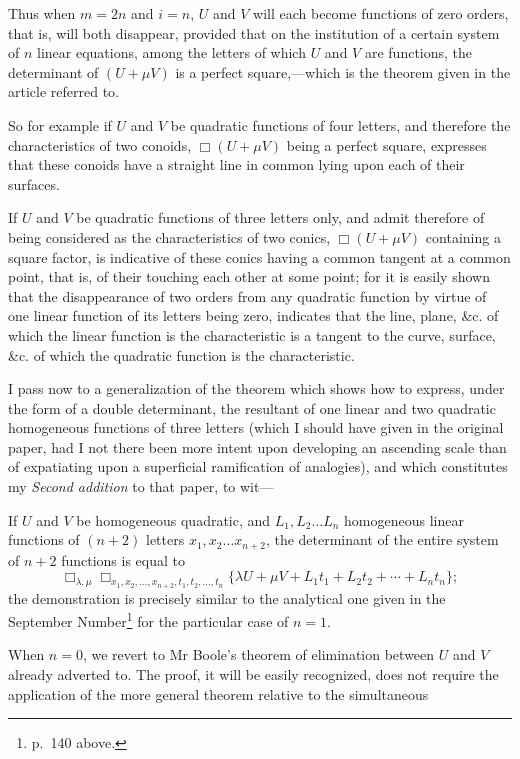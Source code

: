 \documentclass[11pt]{article}
\begin{document}
Thus when $m=2n$ and $i=n$, $U$ and $V$ will each become functions of zero orders, that is, will both disappear, provided that on the institution of a certain system of $n$ linear equations, among the letters of which $U$ and $V$ are functions, the determinant of $(U+\mu V)$ is a perfect square,---which is the theorem given in the article referred to.

So for example if $U$ and $V$ be quadratic functions of four letters, and therefore the characteristics of two conoids, $\Box(U+\mu V)$ being a perfect square, expresses that these conoids have a straight line in common lying upon each of their surfaces.

If $U$ and $V$ be quadratic functions of three letters only, and admit therefore of being considered as the characteristics of two conics, $\Box(U+\mu V)$ containing a square factor, is indicative of these conics having a common tangent at a common point, that is, of their touching each other at some point; for it is easily shown that the disappearance of two orders from any quadratic function by virtue of one linear function of its letters being zero, indicates that the line, plane, \&c. of which the linear function is the characteristic is a tangent to the curve, surface, \&c. of which the quadratic function is the characteristic.

I pass now to a generalization of the theorem which shows how to express, under the form of a double determinant, the resultant of one linear and two quadratic homogeneous functions of three letters (which I should have given in the original paper, had I not there been more intent upon developing an ascending scale than of expatiating upon a superficial ramification of analogies), and which constitutes my \emph{Second addition} to that paper, to wit---

If $U$ and $V$ be homogeneous quadratic, and $L_1,L_2\ldots L_n$ homogeneous linear functions of $(n+2)$ letters $x_1,x_2\ldots x_{n+2}$, the determinant of the entire system of $n+2$ functions is equal to
\[
\Box_{\lambda,\mu}\Box_{x_1,x_2,\ldots,x_{n+2},t_1,t_2,\ldots,t_n}
\{\lambda U+\mu V+L_1t_1+L_2t_2+\cdots+L_nt_n\};
\]
the demonstration is precisely similar to the analytical one given in the September Number\footnote{p.~140 above.} for the particular case of $n=1$.

When $n=0$, we revert to Mr Boole's theorem of elimination between $U$ and $V$ already adverted to. The proof, it will be easily recognized, does not require the application of the more general theorem relative to the simultaneous
\end{document}
